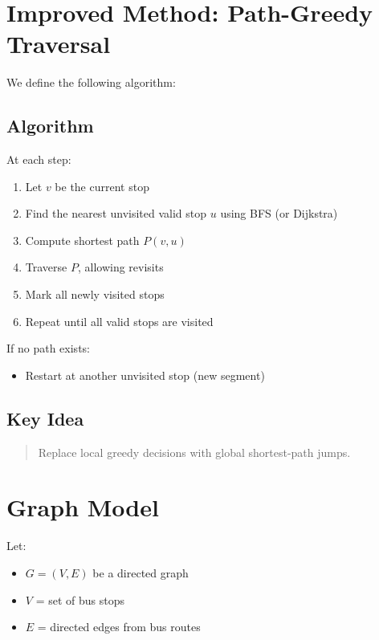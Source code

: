 \documentclass[11pt]{article}
\begin{document}
\section{Improved Method: Path-Greedy Traversal}

We define the following algorithm:

\subsection*{Algorithm}

At each step:

\begin{enumerate}
    \item Let $v$ be the current stop
    \item Find the nearest unvisited valid stop $u$ using BFS (or Dijkstra)
    \item Compute shortest path $P(v, u)$
    \item Traverse $P$, allowing revisits
    \item Mark all newly visited stops
    \item Repeat until all valid stops are visited
\end{enumerate}

If no path exists:

\begin{itemize}
    \item Restart at another unvisited stop (new segment)
\end{itemize}

\subsection*{Key Idea}

\begin{quote}
Replace local greedy decisions with global shortest-path jumps.
\end{quote}

\section{Graph Model}

Let:

\begin{itemize}
    \item $G = (V, E)$ be a directed graph
    \item $V$ = set of bus stops
    \item $E$ = directed edges from bus routes
\end{itemize}
\end{document}
